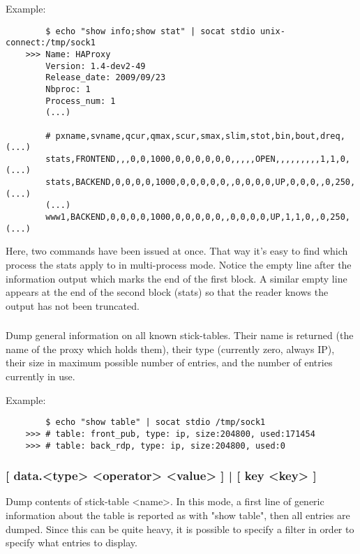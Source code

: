   Example:
  \begin{verbatim}
        $ echo "show info;show stat" | socat stdio unix-connect:/tmp/sock1
    >>> Name: HAProxy
        Version: 1.4-dev2-49
        Release_date: 2009/09/23
        Nbproc: 1
        Process_num: 1
        (...)

        # pxname,svname,qcur,qmax,scur,smax,slim,stot,bin,bout,dreq,  (...)
        stats,FRONTEND,,,0,0,1000,0,0,0,0,0,0,,,,,OPEN,,,,,,,,,1,1,0, (...)
        stats,BACKEND,0,0,0,0,1000,0,0,0,0,0,,0,0,0,0,UP,0,0,0,,0,250,(...)
        (...)
        www1,BACKEND,0,0,0,0,1000,0,0,0,0,0,,0,0,0,0,UP,1,1,0,,0,250, (...)
    \end{verbatim}

    Here, two commands have been issued at once. That way it's easy to find
    which process the stats apply to in multi-process mode. Notice the empty
    line after the information output which marks the end of the first block.
    A similar empty line appears at the end of the second block (stats) so that
    the reader knows the output has not been truncated.

\subsubsection[show table]{}

  Dump general information on all known stick-tables. Their name is returned
  (the name of the proxy which holds them), their type (currently zero, always
  IP), their size in maximum possible number of entries, and the number of
  entries currently in use.

  Example:
  \begin{verbatim}
        $ echo "show table" | socat stdio /tmp/sock1
    >>> # table: front_pub, type: ip, size:204800, used:171454
    >>> # table: back_rdp, type: ip, size:204800, used:0
  \end{verbatim}

\subsubsection[show table <name>]{ [ data.<type> <operator> <value> ] | [ key <key> ]}

  Dump contents of stick-table <name>. In this mode, a first line of generic
  information about the table is reported as with "show table", then all
  entries are dumped. Since this can be quite heavy, it is possible to specify
  a filter in order to specify what entries to display.

